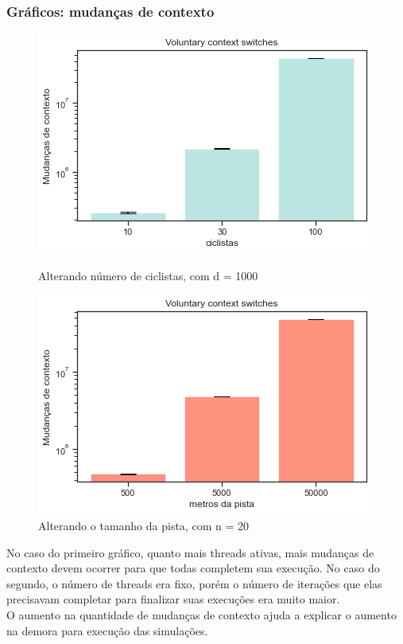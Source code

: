 \documentclass{beamer}
\begin{document}
\begin{frame}
\frametitle{Gráficos: mudanças de contexto}
\begin{figure}[!htb]

%
  \includegraphics[width=\linewidth]{imgs/ciclistas_contexto}
  \caption{{\footnotesize Alterando número de ciclistas, com d = 1000}}\label{fig:awesome_image3}
\endminipage
{}%
  \includegraphics[width=\linewidth]{imgs/pistas_contexto}
  \caption{{\footnotesize Alterando o tamanho da pista, com n = 20}}\label{fig:awesome_image3}
\endminipage
\end{figure}

\begin{small} 


No caso do primeiro gráfico, quanto mais threads ativas, mais mudanças de contexto devem ocorrer para que todas completem sua execução. No caso do segundo, o número de threads era fixo, porém o número de iterações que elas precisavam completar para finalizar suas execuções era muito maior. \\

O aumento na quantidade de mudanças de contexto ajuda a explicar o aumento na demora para execução das simulações. 

\end{small} 



\end{frame}
\end{document}
